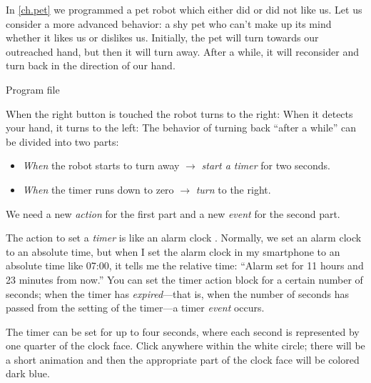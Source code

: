 
\label{ch.time}

In \cref{ch.pet} we programmed a pet robot which either did or did not
like us. Let us consider a more advanced behavior: a shy pet who can't
make up its mind whether it likes us or dislikes us. Initially, the pet
will turn towards our outreached hand, but then it will turn away. After
a while, it will reconsider and turn back in the direction of our hand.

{\raggedleft \hfill Program file }

When the right button is touched the robot turns to the right:
 When it detects your hand, it turns to the left:
 The behavior of turning back ``after a while'' can be
divided into two parts:

\begin{itemize}

\item \emph{When} the robot starts to turn away $\rightarrow$
\emph{start a timer} for two seconds.

\item \emph{When} the timer runs down to zero $\rightarrow$ \emph{turn}
to the right.

\end{itemize}

We need a new \emph{action} for the first part and a new \emph{event}
for the second part.

The action to set a \emph{timer} is like an alarm clock
. Normally, we set an alarm clock to an absolute
time, but when I set the alarm clock in my smartphone to an absolute
time like 07:00, it tells me the relative time: ``Alarm set for 11 hours
and 23 minutes from now.'' You can set the timer action block for a
certain number of seconds; when the timer has \emph{expired}---that is,
when the number of seconds has passed from the setting of the timer---a
timer \emph{event} occurs.

The timer can be set for up to four seconds, where each second is
represented by one quarter of the clock face. Click anywhere within the
white circle; there will be a short animation and then the appropriate
part of the clock face will be colored dark blue.


